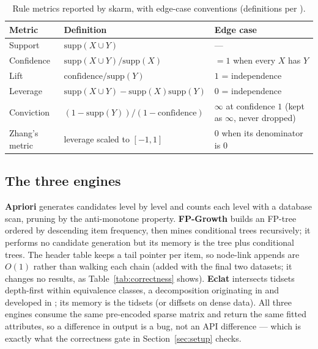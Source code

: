 \documentclass[twocolumn,10pt]{article}
\newcommand{\skarm}{\textsf{skarm}}
\begin{document}
\begin{table}[t]
\centering
\caption{Rule metrics reported by \skarm, with edge-case conventions
(definitions per \cite{hahsler}).}
\label{tab:metrics}
\begin{tabular}{lll}
\toprule
Metric & Definition & Edge case \\
\midrule
Support & $\mathrm{supp}(X \cup Y)$ & --- \\
Confidence & $\mathrm{supp}(X \cup Y) / \mathrm{supp}(X)$ & $=1$ when every $X$ has $Y$ \\
Lift & $\mathrm{confidence} / \mathrm{supp}(Y)$ & $1$ = independence \\
Leverage & $\mathrm{supp}(X \cup Y) - \mathrm{supp}(X)\mathrm{supp}(Y)$ & $0$ = independence \\
Conviction & $(1 - \mathrm{supp}(Y)) / (1 - \mathrm{confidence})$ & $\infty$ at confidence $1$ (kept as $\infty$, never dropped) \\
Zhang's metric & leverage scaled to $[-1, 1]$ & $0$ when its denominator is $0$ \\
\bottomrule
\end{tabular}
\end{table}

\subsection{The three engines}
\textbf{Apriori} generates candidates level by level and counts each
level with a database scan, pruning by the anti-monotone property.
\textbf{FP-Growth} builds an FP-tree ordered by descending item
frequency, then mines conditional trees recursively; it performs no
candidate generation but its memory is the tree plus conditional trees.
The header table keeps a tail pointer per item, so node-link appends
are $O(1)$ rather than walking each chain (added with the final two
datasets; it changes no results, as Table~\ref{tab:correctness}
shows).
\textbf{Eclat} intersects tidsets depth-first within equivalence
classes, a decomposition originating in \cite{zaki1997} and developed
in \cite{zaki2000}; its memory is the tidsets (or diffsets on dense data). All
three engines consume the same pre-encoded sparse matrix and return the
same fitted attributes, so a difference in output is a bug, not an API
difference --- which is exactly what the correctness gate in
Section~\ref{sec:setup} checks.
\end{document}
